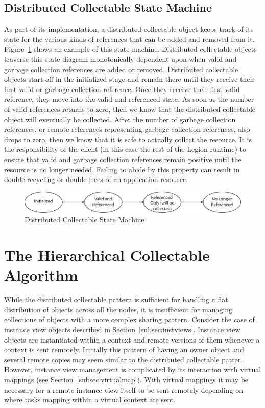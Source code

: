 \subsection{Distributed Collectable State Machine}
\label{subsec:distmachine}
As part of its implementation, a distributed collectable
object keeps track of its state for the various kinds
of references that can be added and removed from it.
Figure~\ref{fig:diststate} shows an example of this
state machine. Distributed collectable objects traverse 
this state diagram monotonically dependent upon when valid
and garbage collection references are added or removed.
Distributed collectable objects start off in the initialized
stage and remain there until they receive their first 
valid or garbage collection reference. Once they receive
their first valid reference, they move into the valid and
referenced state. As soon as the number of valid references
returns to zero, then we know that the distributed
collectable object will eventually be collected. After
the number of garbage collection references, or remote references
representing garbage collection references, also drops
to zero, then we know that it is safe to actually 
collect the resource. It is the responsibility of the
client (in this case the rest of the Legion runtime)
to ensure that valid and garbage collection references
remain positive until the resource is no longer needed.
Failing to abide by this property can result
in double recycling or double frees of an application
resource.

\begin{figure}
\centering
\includegraphics[scale=0.6]{figs/CollectableStateMachine.pdf}
\caption{Distributed Collectable State Machine\label{fig:diststate}}
\end{figure}

\section{The Hierarchical Collectable Algorithm}
\label{sec:hiercollect}
While the distributed collectable pattern is sufficient
for handling a flat distribution of objects across all
the nodes, it is insufficient for managing collections
of objects with a more complex sharing pattern. Consider
the case of instance view objects described in 
Section~\ref{subsec:instviews}. Instance view objects
are instantiated within a context and remote versions
of them whenever a context is sent remotely. Initially
this pattern of having an owner object and several
remote copies may seem similar to the distributed
collectable patter.  However, instance view management
is complicated by its interaction with virtual 
mappings (see Section~\ref{subsec:virtualmap}). With
virtual mappings it may be necessary for a remote
instance view itself to be sent remotely depending
on where tasks mapping within a virtual context are
sent. 

